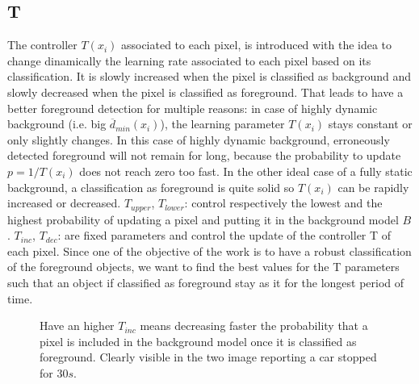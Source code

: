 \subsection*{T}
The controller $T(x_i)$ associated to each pixel, is introduced with the idea to change dinamically the learning rate associated to each pixel based on its classification. It is slowly increased when the pixel is classified as background and slowly decreased when the pixel is classified as foreground. That leads to have a better foreground detection for multiple reasons: in case of highly dynamic background (i.e. big $\overline{d}_{min}(x_i)$), the learning parameter $T(x_i)$ stays constant or only slightly changes. In this case of highly dynamic background, erroneously detected foreground will not remain for long, because the probability to update $p = 1/T(x_i)$ does not reach
zero too fast. \newline
In the other ideal case of a fully static background, a classification as foreground is quite solid so $T(x_i)$ can be rapidly increased or decreased. \newline
$T_{upper}$, $T_{lower}$: control respectively the lowest and the highest probability of updating a pixel and putting it in the background model $B$. \newline
$T_{inc}$, $T_{dec}$: are fixed parameters and control the update of the controller T of each pixel.\newline
Since one of the objective of the work is to have a robust classification of the foreground objects, we want to find the best values for the T parameters such that an object if classified as foreground stay as it for the longest period of time. 
\begin{figure}[!t]
    \centering
    \newline
    \caption{Have an higher $T_{inc}$ means decreasing faster the probability that a pixel is included in the background model once it is classified as foreground. Clearly visible in the two image reporting a car stopped for $30s$.}
\end{figure}


